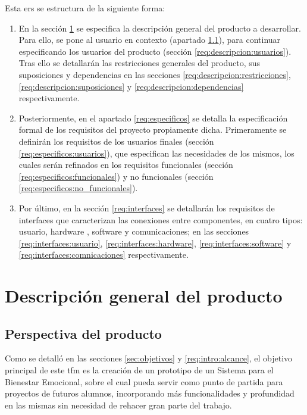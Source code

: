         Esta \gls{ers} se estructura de la siguiente forma:

        \begin{enumerate}
            \item En la sección \ref{req:descripcion} se especifica la descripción general del producto a desarrollar. Para ello, se pone al usuario en contexto (apartado \ref{req:descripcion:perspectiva}), para continuar especificando los usuarios del producto (sección \ref{req:descripcion:usuarios}). Tras ello se detallarán las restricciones generales del producto, sus suposiciones y dependencias en las secciones 
            \ref{req:descripcion:restricciones}, \ref{req:descripcion:suposiciones} y \ref{req:descripcion:dependencias} respectivamente.
            \item Posteriormente, en el apartado \ref{req:especificos} se detalla la especificación formal de los requisitos del proyecto propiamente dicha. Primeramente se definirán los requisitos de los usuarios finales (sección \ref{req:especificos:usuarios}), que especifican las necesidades de los mismos, los cuales serán refinados en los requisitos funcionales (sección \ref{req:especificos:funcionales}) y no funcionales (sección \ref{req:especificos:no_funcionales}).
            \item Por último, en la sección \ref{req:interfaces} se detallarán los requisitos de interfaces que caracterizan las conexiones entre componentes, en cuatro tipos: usuario, hardware , software y comunicaciones; en las secciones \ref{req:interfaces:usuario}, \ref{req:interfaces:hardware}, \ref{req:interfaces:software} y \ref{req:interfaces:comnicaciones} respectivamente.
        \end{enumerate}
        
\section{Descripción general del producto}
    \label{req:descripcion}

    \subsection{Perspectiva del producto}
        \label{req:descripcion:perspectiva}

        Como se detalló en las secciones \ref{sec:objetivos} y 
        \ref{req:intro:alcance}, el objetivo principal de este \gls{tfm} es la creación de un prototipo de un Sistema para el Bienestar Emocional, sobre el cual pueda servir como punto de partida para proyectos de futuros alumnos, incorporando más funcionalidades y profundidad en las mismas sin necesidad de rehacer gran parte del trabajo. 

